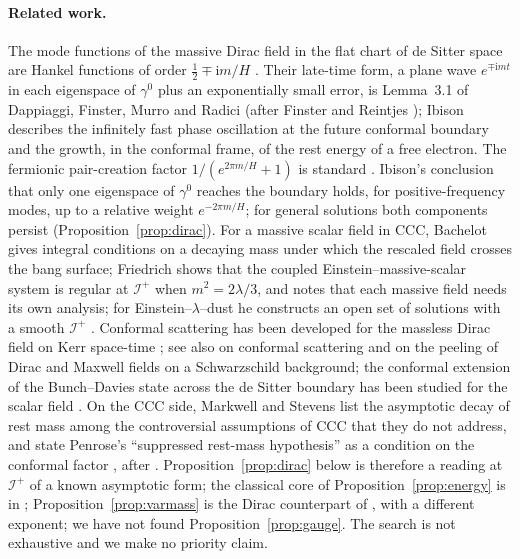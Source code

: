 \documentclass[11pt,a4paper]{article}
\theoremstyle{definition}
\newcommand{\scri}{\mathscr{I}^{+}}
\newcommand{\ii}{\mathrm{i}}
\begin{document}
\paragraph{Related work.} The mode functions of the massive Dirac field in the flat chart of de Sitter space are Hankel functions of order $\tfrac12\mp\ii m/H$ \cite{Cotaescu2002}. Their late-time form, a plane wave $e^{\mp\ii mt}$ in each eigenspace of $\gamma^{0}$ plus an exponentially small error, is Lemma~3.1 of Dappiaggi, Finster, Murro and Radici \cite{DFMR2019} (after Finster and Reintjes \cite{FinsterReintjes2016}); Ibison \cite{Ibison2011} describes the infinitely fast phase oscillation at the future conformal boundary and the growth, in the conformal frame, of the rest energy of a free electron. The fermionic pair-creation factor $1/(e^{2\pi m/H}+1)$ is standard \cite{Boonpan2026}. Ibison's conclusion that only one eigenspace of $\gamma^{0}$ reaches the boundary holds, for positive-frequency modes, up to a relative weight $e^{-2\pi m/H}$; for general solutions both components persist (Proposition~\ref{prop:dirac}). For a massive scalar field in CCC, Bachelot \cite{Bachelot2020} gives integral conditions on a decaying mass under which the rescaled field crosses the bang surface; Friedrich \cite{Friedrich2015} shows that the coupled Einstein--massive-scalar system is regular at $\scri$ when $m^{2}=2\lambda/3$, and notes that each massive field needs its own analysis; for Einstein--$\lambda$--dust he constructs an open set of solutions with a smooth $\scri$ \cite{Friedrich2017}. Conformal scattering has been developed for the massless Dirac field on Kerr space-time \cite{Pham2021}; see also \cite{MasonNicolas2004} on conformal scattering and \cite{MasonNicolas2012} on the peeling of Dirac and Maxwell fields on a Schwarzschild background; the conformal extension of the Bunch--Davies state across the de Sitter boundary has been studied for the scalar field \cite{Wrochna2017}. On the CCC side, Markwell and Stevens list the asymptotic decay of rest mass among the controversial assumptions of CCC that they do not address, and state Penrose's ``suppressed rest-mass hypothesis'' as a condition on the conformal factor \cite{MarkwellStevens2022}, after \cite{GurzadyanPenrose2013}. Proposition~\ref{prop:dirac} below is therefore a reading at $\scri$ of a known asymptotic form; the classical core of Proposition~\ref{prop:energy} is in \cite{Ibison2011}; Proposition~\ref{prop:varmass} is the Dirac counterpart of \cite{Bachelot2020}, with a different exponent; we have not found Proposition~\ref{prop:gauge}. The search is not exhaustive and we make no priority claim.
\end{document}
